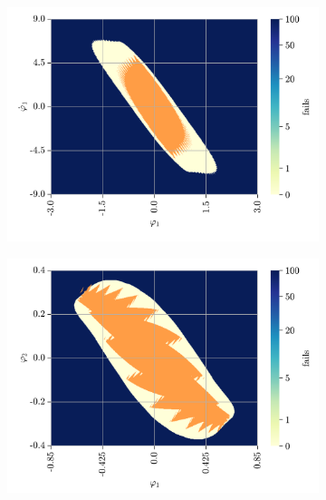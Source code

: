 \begin{figure}[h!]
	\centering
	\begin{subfigure}[t]{0.48\textwidth}
		\centering
		\includegraphics[width=\textwidth]{Figures/SP_continuous_vs_discrete_phi1phi1dot.png}
		\label{fig: sp - continuous vs discrete}
		\caption{}
	\end{subfigure}
	\hfill
	\begin{subfigure}[t]{0.48\textwidth}
		\centering
		\includegraphics[width=\textwidth]{Figures/DP_continuous_vs_discrete_phi1phi2.png}
		\label{fig: dp - continuous vs discrete}
		\caption{}
	\end{subfigure}
	
	\vspace{0.2cm}
	

\end{figure}
